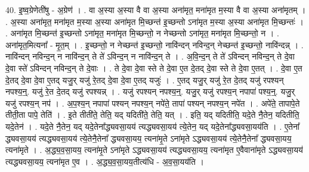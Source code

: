 \documentclass[17pt]{extarticle}
\begin{document}
40. इ॒ष्व॒ग्रेणेती॑षु - अ॒ग्रेण॑ । . वा अ॒स्या अ॒स्या वै वा अ॒स्या अना॑मृत॒ मना॑मृत म॒स्या वै वा अ॒स्या अना॑मृतम् । . अ॒स्या अना॑मृत॒ मना॑मृत म॒स्या अ॒स्या अना॑मृत मि॒च्छन्त॑ इ॒च्छन्तो ऽना॑मृत म॒स्या अ॒स्या अना॑मृत मि॒च्छन्तः॑ । . अना॑मृत मि॒च्छन्त॑ इ॒च्छन्तो ऽना॑मृत॒ मना॑मृत मि॒च्छन्तो॒ न नेच्छन्तो ऽना॑मृत॒ मना॑मृत मि॒च्छन्तो॒ न । . अना॑मृत॒मित्यना᳚ - मृ॒त॒म् । . इ॒च्छन्तो॒ न नेच्छन्त॑ इ॒च्छन्तो॒ नावि॑न्दन् नविन्द॒न् नेच्छन्त॑ इ॒च्छन्तो॒ नावि॑न्दन्न् । . नावि॑न्दन् नविन्द॒न् न नावि॑न्द॒न् ते ते॑ ऽविन्द॒न् न नावि॑न्द॒न् ते । . अ॒वि॒न्द॒न् ते ते॑ ऽविन्दन् नविन्द॒न् ते दे॒वा दे॒वा स्ते॑ ऽविन्दन् नविन्द॒न् ते दे॒वाः । . ते दे॒वा दे॒वा स्ते ते दे॒वा ए॒त दे॒तद् दे॒वा स्ते ते दे॒वा ए॒तत् । . दे॒वा ए॒त दे॒तद् दे॒वा दे॒वा ए॒तद् यजु॒र् यजु॑ रे॒तद् दे॒वा दे॒वा ए॒तद् यजुः॑ । . ए॒तद् यजु॒र् यजु॑ रे॒त दे॒तद् यजु॑ रपश्यन् नपश्य॒न्॒. यजु॑ रे॒त दे॒तद् यजु॑ रपश्यन्न् । . यजु॑ रपश्यन् नपश्य॒न्॒. यजु॒र् यजु॑ रपश्य॒न् नपापा॑ पश्य॒न्॒. यजु॒र् यजु॑ रपश्य॒न् नप॑ । . अ॒प॒श्य॒न् नपापा॑ पश्यन् नपश्य॒न् नपे॑ते॒ तापा॑ पश्यन् नपश्य॒न् नपे॑त । . अपे॑ते॒ तापापे॒ते तीती॒ता पापे॒ तेति॑ । . इ॒ते तीती॑ते॒ तेति॒ यद् यदिती॑ते॒ तेति॒ यत् । . इति॒ यद् यदितीति॒ यदे॒ते नै॒तेन॒ यदितीति॒ यदे॒तेन॑ । . यदे॒ते नै॒तेन॒ यद् यदे॒तेना᳚द्ध्यवसा॒यय॑ त्यद्ध्यवसा॒यय॑ त्ये॒तेन॒ यद् यदे॒तेना᳚द्ध्यवसा॒यय॑ति । . ए॒तेना᳚ द्ध्यवसा॒यय॑ त्यद्ध्यवसा॒यय॑ त्ये॒तेनै॒तेना᳚ द्ध्यवसा॒यय॒ त्यना॑मृ॒ते ऽना॑मृते ऽद्ध्यवसा॒यय॑ त्ये॒तेनै॒तेना᳚ द्ध्यवसा॒यय॒ त्यना॑मृते । . अ॒द्ध्य॒व॒सा॒यय॒ त्यना॑मृ॒ते ऽना॑मृते ऽद्ध्यवसा॒यय॑ त्यद्ध्यवसा॒यय॒ त्यना॑मृत ए॒वैवाना॑मृते ऽद्ध्यवसा॒यय॑ त्यद्ध्यवसा॒यय॒ त्यना॑मृत ए॒व । . अ॒द्ध्य॒व॒सा॒यय॒तीत्य॑धि - अ॒व॒सा॒यय॑ति । \newline
\pagebreak
{}
\end{document}
